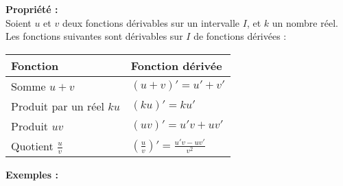 \documentclass[11pt,a4paper]{article}
\begin{document}
\begin{mdframed}[style=proprieteStyle]
    \textbf{Propriété :} ~\\
    Soient $u$ et $v$ deux fonctions dérivables sur un intervalle $I$, et $k$ un nombre réel. \\
    Les fonctions suivantes sont dérivables sur $I$ de fonctions dérivées : \\

    \renewcommand{\arraystretch}{2}
    \begin{tabularx}{\linewidth}{|Y|Y|}
        \hline
        \textbf{Fonction}                     & \textbf{Fonction dérivée}                                      \\
        \hline
        Somme $u+v$                           & $(u+v)'=u'+v'$                                                 \\
        \hline
        Produit par un réel $ku$              & $(ku)'=ku'$                                                    \\
        \hline
        Produit $uv$                          & $(uv)'=u'v+uv'$                                                \\
        \hline
        Quotient $\displaystyle{}\frac{u}{v}$ & $\displaystyle{}\left(\frac{u}{v}\right)'=\frac{u'v-uv'}{v^2}$ \\
        \hline
    \end{tabularx}
\end{mdframed}

\textbf{Exemples :}
\end{document}
